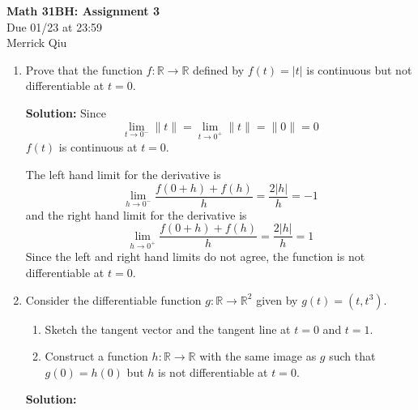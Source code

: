 \documentclass{report}
\newcommand{\solution}{\textbf{Solution: }}
\begin{document}
\begin{center}
	\huge{\bf Math 31BH: Assignment 3} \\
	Due 01/23 at 23:59 \\
	Merrick Qiu
\end{center}

\bigskip

\begin{enumerate}

	\item
	Prove that the function $f \colon \mathbb{R} \to \mathbb{R}$ defined by $f(t)=|t|$ is continuous but 
	not differentiable at $t=0$.
	
	\solution 
	Since 
	\[
		\lim_{t\to0^-} \|t\| = \lim_{t\to0^+} \|t\| = \|0\| = 0
	\]
	$f(t)$ is continuous at $t=0$.
	
	The left hand limit for the derivative is
	\[
		\lim_{h\to0^-} \frac{f(0+h) + f(h)}{h} = \frac{2|h|}{h} = -1
	\]
	and the right hand limit for the derivative is
	\[
		\lim_{h\to0^+} \frac{f(0+h) + f(h)}{h} = \frac{2|h|}{h} = 1
	\]
	Since the left and right hand limits do not agree, 
	the function is not differentiable at $t=0$.

	\medskip
	\item
	Consider the differentiable function $g \colon \mathbb{R} \to \mathbb{R}^2$ given by
	$g(t)=(t,t^3)$.
	
		\begin{enumerate}
		
			\smallskip
			\item
			Sketch the tangent vector and the tangent line at $t=0$ and $t=1.$
			
			\smallskip
			\item
			Construct a function $h \colon \mathbb{R} \to \mathbb{R}$ with the 
			same image as $g$ such that $g(0)=h(0)$ but $h$ is not differentiable
			at $t=0$.
		
		\end{enumerate}			
		
	\solution


\end{enumerate}
\end{document}
